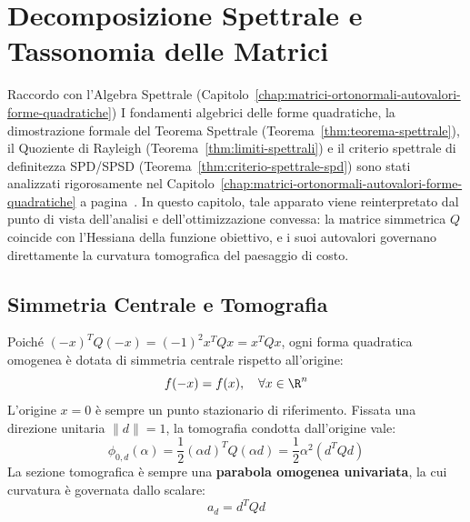 \FloatBarrier
\section{Decomposizione Spettrale e Tassonomia delle Matrici}
\label{sec:opt-decomposizione-spettrale-tassonomia}

\begin{noteblock}{Raccordo con l'Algebra Spettrale (Capitolo~\ref{chap:matrici-ortonormali-autovalori-forme-quadratiche})}
I fondamenti algebrici delle forme quadratiche, la dimostrazione formale del Teorema Spettrale (Teorema~\ref{thm:teorema-spettrale}), il Quoziente di Rayleigh (Teorema~\ref{thm:limiti-spettrali}) e il criterio spettrale di definitezza SPD/SPSD (Teorema~\ref{thm:criterio-spettrale-spd}) sono stati analizzati rigorosamente nel Capitolo~\ref{chap:matrici-ortonormali-autovalori-forme-quadratiche} a pagina~\pageref{sec:matrici-spd-spsd}.
In questo capitolo, tale apparato viene reinterpretato dal punto di vista dell'analisi e dell'ottimizzazione convessa: la matrice simmetrica $Q$ coincide con l'Hessiana della funzione obiettivo, e i suoi autovalori governano direttamente la curvatura tomografica del paesaggio di costo.
\end{noteblock}

\subsection{Simmetria Centrale e Tomografia}
Poich\'e $(-x)^T Q (-x) = (-1)^2 x^T Q x = x^T Q x$, ogni forma quadratica omogenea \`e dotata di simmetria centrale rispetto all'origine:
\begin{equation}
f(-x) = f(x), \quad \forall x \in \R^n
\end{equation}
L'origine $x = 0$ \`e sempre un punto stazionario di riferimento. Fissata una direzione unitaria $\|d\| = 1$, la tomografia condotta dall'origine vale:
\begin{equation}
\phi_{0, d}(\alpha) = \frac{1}{2} (\alpha d)^T Q (\alpha d) = \frac{1}{2} \alpha^2 (d^T Q d)
\end{equation}
La sezione tomografica \`e sempre una \textbf{parabola omogenea univariata}, la cui curvatura \`e governata dallo scalare:
\begin{equation}
a_d = d^T Q d
\end{equation}

